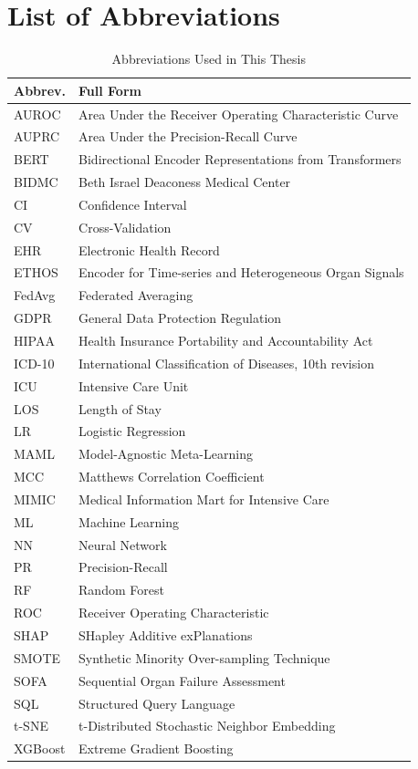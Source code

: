 \chapter{List of Abbreviations}
\label{app:abbreviations}

\begin{table}[htbp]
\centering
\caption{Abbreviations Used in This Thesis}
\begin{tabular}{ll}
\toprule
\textbf{Abbrev.} & \textbf{Full Form} \\
\midrule
AUROC & Area Under the Receiver Operating Characteristic Curve \\
AUPRC & Area Under the Precision-Recall Curve \\
BERT & Bidirectional Encoder Representations from Transformers \\
BIDMC & Beth Israel Deaconess Medical Center \\
CI & Confidence Interval \\
CV & Cross-Validation \\
EHR & Electronic Health Record \\
ETHOS & Encoder for Time-series and Heterogeneous Organ Signals \\
FedAvg & Federated Averaging \\
GDPR & General Data Protection Regulation \\
HIPAA & Health Insurance Portability and Accountability Act \\
ICD-10 & International Classification of Diseases, 10th revision \\
ICU & Intensive Care Unit \\
LOS & Length of Stay \\
LR & Logistic Regression \\
MAML & Model-Agnostic Meta-Learning \\
MCC & Matthews Correlation Coefficient \\
MIMIC & Medical Information Mart for Intensive Care \\
ML & Machine Learning \\
NN & Neural Network \\
PR & Precision-Recall \\
RF & Random Forest \\
ROC & Receiver Operating Characteristic \\
SHAP & SHapley Additive exPlanations \\
SMOTE & Synthetic Minority Over-sampling Technique \\
SOFA & Sequential Organ Failure Assessment \\
SQL & Structured Query Language \\
t-SNE & t-Distributed Stochastic Neighbor Embedding \\
XGBoost & Extreme Gradient Boosting \\
\bottomrule
\end{tabular}
\label{tab:abbreviations}
\end{table}

